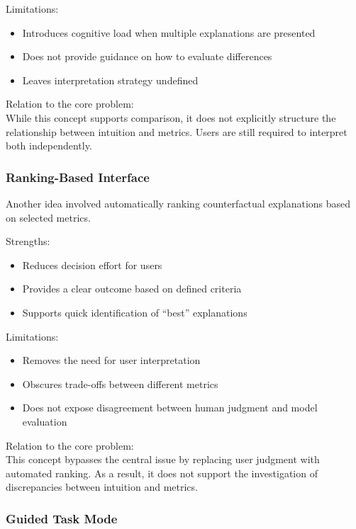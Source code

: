 \documentclass[
  letterpaper,
  DIV=11,
  numbers=noendperiod]{scrartcl}
\providecommand{\tightlist}{%
  \setlength{\itemsep}{0pt}\setlength{\parskip}{0pt}}\usepackage{longtable,booktabs,array}
\begin{document}
Limitations:

\begin{itemize}
\tightlist
\item
  Introduces cognitive load when multiple explanations are presented
\item
  Does not provide guidance on how to evaluate differences
\item
  Leaves interpretation strategy undefined
\end{itemize}

Relation to the core problem:\\
While this concept supports comparison, it does not explicitly structure
the relationship between intuition and metrics. Users are still required
to interpret both independently.

\subsubsection{Ranking-Based Interface}\label{ranking-based-interface}

Another idea involved automatically ranking counterfactual explanations
based on selected metrics.

Strengths:

\begin{itemize}
\tightlist
\item
  Reduces decision effort for users
\item
  Provides a clear outcome based on defined criteria
\item
  Supports quick identification of ``best'' explanations
\end{itemize}

Limitations:

\begin{itemize}
\tightlist
\item
  Removes the need for user interpretation
\item
  Obscures trade-offs between different metrics
\item
  Does not expose disagreement between human judgment and model
  evaluation
\end{itemize}

Relation to the core problem:\\
This concept bypasses the central issue by replacing user judgment with
automated ranking. As a result, it does not support the investigation of
discrepancies between intuition and metrics.

\subsubsection{Guided Task Mode}\label{guided-task-mode}
\end{document}
